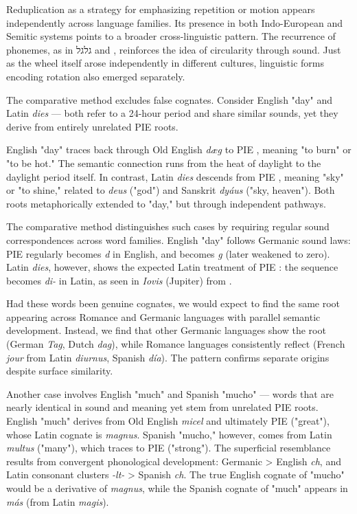 Reduplication as a strategy for emphasizing repetition or motion appears independently across language families. Its presence in both Indo-European and Semitic systems points to a broader cross-linguistic pattern. The recurrence of phonemes, as in \texthebrew{גלגל} and , reinforces the idea of circularity through sound. Just as the wheel itself arose independently in different cultures, linguistic forms encoding rotation also emerged separately.

The comparative method excludes false cognates. Consider English "day" and Latin \emph{dies} — both refer to a 24-hour period and share similar sounds, yet they derive from entirely unrelated PIE roots.

English "day" traces back through Old English \emph{dæg} to PIE , meaning "to burn" or "to be hot." The semantic connection runs from the heat of daylight to the daylight period itself. In contrast, Latin \emph{dies} descends from PIE , meaning "sky" or "to shine," related to \emph{deus} ("god") and Sanskrit \emph{dyáus} ("sky, heaven"). Both roots metaphorically extended to "day," but through independent pathways.

The comparative method distinguishes such cases by requiring regular sound correspondences across word families. English "day" follows Germanic sound laws: PIE  regularly becomes \emph{d} in English, and  becomes \emph{g} (later weakened to zero). Latin \emph{dies}, however, shows the expected Latin treatment of PIE : the sequence becomes \emph{di-} in Latin, as seen in \emph{Iovis} (Jupiter) from .

Had these words been genuine cognates, we would expect to find the same root appearing across Romance and Germanic languages with parallel semantic development. Instead, we find that other Germanic languages show the  root (German \emph{Tag}, Dutch \emph{dag}), while Romance languages consistently reflect  (French \emph{jour} from Latin \emph{diurnus}, Spanish \emph{día}). The pattern confirms separate origins despite surface similarity.

Another case involves English "much" and Spanish "mucho" — words that are nearly identical in sound and meaning yet stem from unrelated PIE roots. English "much" derives from Old English \emph{micel} and ultimately PIE  ("great"), whose Latin cognate is \emph{magnus}. Spanish "mucho," however, comes from Latin \emph{multus} ("many"), which traces to PIE  ("strong"). The superficial resemblance results from convergent phonological development: Germanic  > English \emph{ch}, and Latin consonant clusters \emph{-lt-} > Spanish \emph{ch}. The true English cognate of "mucho" would be a derivative of \emph{magnus}, while the Spanish cognate of "much" appears in \emph{más} (from Latin \emph{magis}).

